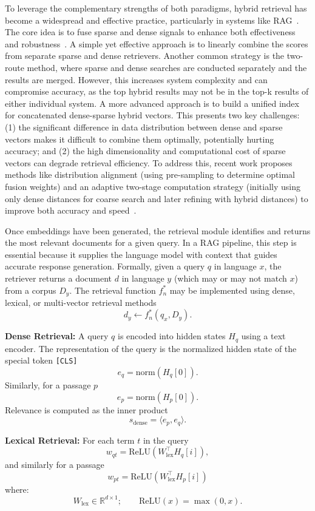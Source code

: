 To leverage the complementary strengths of both paradigms, hybrid retrieval has become a widespread and effective practice, particularly in systems like RAG~\cite{lewis2020rag}. The core idea is to fuse sparse and dense signals to enhance both effectiveness and robustness~\cite{formal2021splade, karpukhin2020dense}. A simple yet effective approach is to linearly combine the scores from separate sparse and dense retrievers. Another common strategy is the two-route method, where sparse and dense searches are conducted separately and the results are merged. However, this increases system complexity and can compromise accuracy, as the top hybrid results may not be in the top-k results of either individual system. A more advanced approach is to build a unified index for concatenated dense-sparse hybrid vectors. This presents two key challenges: (1) the significant difference in data distribution between dense and sparse vectors makes it difficult to combine them optimally, potentially hurting accuracy; and (2) the high dimensionality and computational cost of sparse vectors can degrade retrieval efficiency. To address this, recent work proposes methods like distribution alignment (using pre-sampling to determine optimal fusion weights) and an adaptive two-stage computation strategy (initially using only dense distances for coarse search and later refining with hybrid distances) to improve both accuracy and speed~\cite{iida2022unsupervised}.

Once embeddings have been generated, the retrieval module identifies and returns the most relevant
documents for a given query. In a RAG pipeline, this step is essential because it supplies the language
model with context that guides accurate response generation. Formally, given a query $q$ in language $x$,
the retriever returns a document $d$ in language $y$ (which may or may not match $x$) from a corpus
$D_y$. The retrieval function $f_n^\ast$ may be implemented using dense, lexical, or multi-vector retrieval
methods~\cite{chen2024bge}
\[
    d_y \leftarrow f_n^\ast(q_x, D_y).
\]

\textbf{Dense Retrieval:} A query $q$ is encoded into hidden states $H_q$ using a text encoder. The representation of the query
is the normalized hidden state of the special token \texttt{[CLS]}
\[
    e_q = \mathrm{norm}(H_q[0]).
\]
Similarly, for a passage $p$
\[
    e_p = \mathrm{norm}(H_p[0]).
\]
Relevance is computed as the inner product
\[
    s_{\mathrm{dense}} = \langle e_p, e_q \rangle.
\]

\textbf{Lexical Retrieval:} For each term $t$ in the query
\[
    w_{q t} = \mathrm{ReLU}(W_{\mathrm{lex}}^\top H_q[i]),
\]
and similarly for a passage
\[
    w_{p t} = \mathrm{ReLU}(W_{\mathrm{lex}}^\top H_p[i])
\]
where:
\[
    W_{\mathrm{lex}} \in \mathbb{R}^{d \times 1};
\qquad
\mathrm{ReLU}(x) = \max(0, x).
\]

